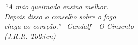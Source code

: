 \begin{epigrafe}
    \vspace*{\fill}
	\begin{flushright}
		\textit{``A mão queimada ensina melhor. \\
		          Depois disso o conselho sobre o fogo \\
                  chega ao coração.''-- Gandalf - O Cinzento \\
		          (J.R.R. Tolkien)}
	\end{flushright}
\end{epigrafe}

